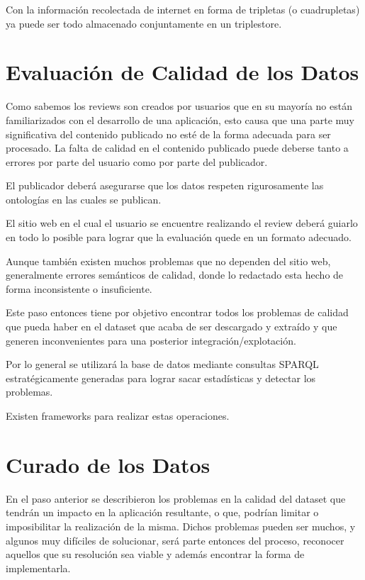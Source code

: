 Con la información recolectada de internet en forma de tripletas (o cuadrupletas) ya puede ser todo almacenado conjuntamente en un triplestore. 


%

 

\section{Evaluación de Calidad de los Datos} 
Como sabemos los reviews son creados por usuarios que en su mayoría no están familiarizados con el desarrollo de una 
aplicación, esto causa que una parte muy significativa del contenido publicado no esté de la forma adecuada para ser procesado. 
La falta de calidad en el contenido publicado puede deberse tanto a errores por parte del usuario como por parte del publicador.


El publicador deberá asegurarse que los datos respeten rigurosamente las ontologías en las cuales se publican.

El sitio web en el cual el usuario se encuentre realizando el review deberá guiarlo en todo lo posible para lograr que la evaluación
quede en un formato adecuado.


Aunque también existen muchos problemas que no dependen del sitio web, generalmente errores semánticos de calidad, donde lo 
redactado esta hecho de forma inconsistente o insuficiente.


Este paso entonces tiene por objetivo encontrar todos los problemas de calidad que pueda haber en el dataset que acaba de 
ser descargado y extraído y que generen inconvenientes para una posterior integración/explotación.

Por lo general se utilizará la base de datos mediante consultas SPARQL estratégicamente generadas para lograr sacar estadísticas y detectar los problemas.

Existen frameworks para realizar estas operaciones.

%
\section{Curado de los Datos}

En el paso anterior se describieron los problemas en la calidad del dataset que tendrán un impacto en la aplicación resultante, 
o que, podrían limitar o imposibilitar la realización de la misma. Dichos problemas pueden ser muchos, y algunos muy difíciles
de solucionar, será parte entonces del proceso, reconocer aquellos que su resolución sea viable y además encontrar la forma de 
implementarla.

